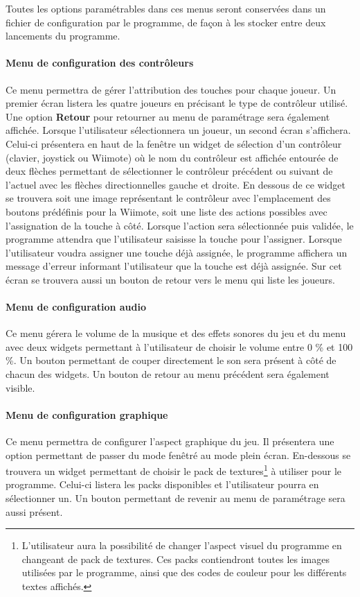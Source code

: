 Toutes les options paramétrables dans ces menus seront conservées dans un fichier de configuration par le programme, de façon à les stocker entre deux lancements du programme.

\paragraph{Menu de configuration des contrôleurs}

Ce menu permettra de gérer l'attribution des touches pour chaque joueur. Un premier écran listera les quatre joueurs en précisant le type de contrôleur utilisé. Une option \textbf{Retour} pour retourner au menu de paramétrage sera également affichée. Lorsque l'utilisateur sélectionnera un joueur, un second écran s'affichera. Celui-ci présentera en haut de la fenêtre un widget de sélection d'un contrôleur (clavier, joystick ou Wiimote) où le nom du contrôleur est affichée entourée de deux flèches permettant de sélectionner le contrôleur précédent ou suivant de l'actuel avec les flèches directionnelles gauche et droite. En dessous de ce widget se trouvera soit une image représentant le contrôleur avec l'emplacement des boutons prédéfinis pour la Wiimote, soit une liste des actions possibles avec l'assignation de la touche à côté. Lorsque l'action sera sélectionnée puis validée, le programme attendra que l'utilisateur saisisse la touche pour l'assigner. Lorsque l'utilisateur voudra assigner une touche déjà assignée, le programme affichera un message d'erreur informant l'utilisateur que la touche est déjà assignée. Sur cet écran se trouvera aussi un bouton de retour vers le menu qui liste les joueurs.

\paragraph{Menu de configuration audio}

Ce menu gérera le volume de la musique et des effets sonores du jeu et du menu avec deux widgets permettant à l'utilisateur de choisir le volume entre 0 \% et 100 \%. Un bouton permettant de couper directement le son sera présent à côté de chacun des widgets. Un bouton de retour au menu précédent sera également visible.

\paragraph{Menu de configuration graphique}

Ce menu permettra de configurer l'aspect graphique du jeu. Il présentera une option permettant de passer du mode fenêtré au mode plein écran. En-dessous se trouvera un widget permettant de choisir le pack de textures\footnote{L'utilisateur aura la possibilité de changer l'aspect visuel du programme en changeant de pack de textures. Ces packs contiendront toutes les images utilisées par le programme, ainsi que des codes de couleur pour les différents textes affichés.} à utiliser pour le programme. Celui-ci listera les packs disponibles et l'utilisateur pourra en sélectionner un. Un bouton permettant de revenir au menu de paramétrage sera aussi présent.

